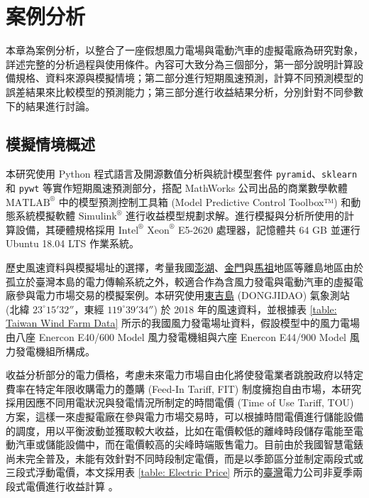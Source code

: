 
\chapter{案例分析}

本章為案例分析，以整合了一座假想風力電場與電動汽車的虛擬電廠為研究對象，詳述完整的分析過程與使用條件。內容可大致分為三個部分，第一部分說明計算設備規格、資料來源與模擬情境；第二部分進行短期風速預測，計算不同預測模型的誤差結果來比較模型的預測能力；第三部分進行收益結果分析，分別針對不同參數下的結果進行討論。

\section{模擬情境概述}

本研究使用 Python 程式語言及開源數值分析與統計模型套件 \texttt{pyramid}、\texttt{sklearn} 和 \texttt{pywt} 等實作短期風速預測部分，搭配 MathWorks 公司出品的商業數學軟體 $\text{MATLAB}^{®}$ 中的模型預測控制工具箱 (Model Predictive Control Toolbox™) 和動態系統模擬軟體 $\text{Simulink}^{®}$ 進行收益模型規劃求解。進行模擬與分析所使用的計算設備，其硬體規格採用 $\text{Intel}^{®}$ $\text{Xeon}^{®}$ E5-2620 處理器，記憶體共 $64$ GB 並運行 Ubuntu 18.04 LTS 作業系統。

歷史風速資料與模擬場址的選擇，考量我國\uline{澎湖}、\uline{金門}與\uline{馬祖}地區等離島地區由於孤立於臺灣本島的電力傳輸系統之外，較適合作為含風力發電與電動汽車的虛擬電廠參與電力市場交易的模擬案例。本研究使用\uline{東吉島} (DONGJIDAO) 氣象測站 (北緯 $23^\circ 15' 32''$，東經 $119^\circ 39'34''$) 於 2018 年的風速資料，並根據表 \ref{table: Taiwan Wind Farm Data} 所示的我國風力發電場址資料，假設模型中的風力電場由八座 Enercon E40/600 Model 風力發電機組與六座 Enercon E44/900 Model 風力發電機組所構成。

收益分析部分的電力價格，考慮未來電力市場自由化將使發電業者跳脫政府以特定費率在特定年限收購電力的躉購 (Feed-In Tariff, FIT) 制度擁抱自由市場，本研究採用因應不同用電狀況與發電情況所制定的時間電價 (Time of Use Tariff, TOU) 方案，這樣一來虛擬電廠在參與電力市場交易時，可以根據時間電價進行儲能設備的調度，用以平衡波動並獲取較大收益，比如在電價較低的離峰時段儲存電能至電動汽車或儲能設備中，而在電價較高的尖峰時端販售電力。目前由於我國智慧電錶尚未完全普及，未能有效針對不同時段制定電價，而是以季節區分並制定兩段式或三段式浮動電價，本文採用表 \ref{table: Electric Price} 所示的\uline{臺灣}電力公司非夏季兩段式電價進行收益計算 \cite{taipower2018price}。

